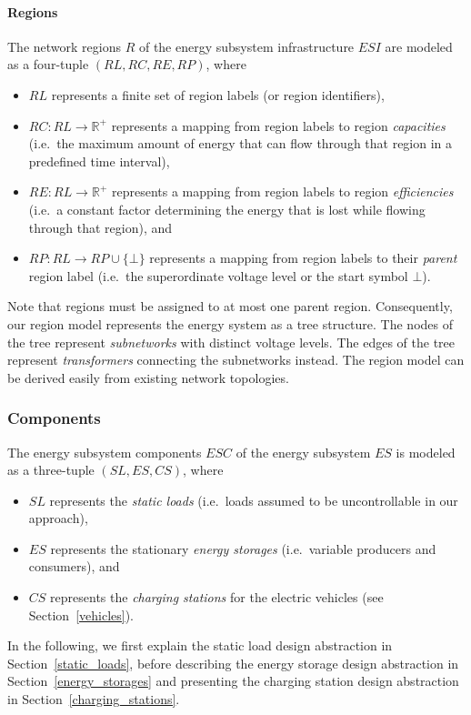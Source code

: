 \paragraph{Regions}
\label{regions}

The network regions $R$ of the energy subsystem infrastructure $ESI$ are modeled as a four-tuple $(RL, RC, RE, RP)$, where
\begin{itemize}
	\item $RL$ represents a finite set of region labels (or region identifiers),
	\item $RC: RL \rightarrow \mathbb{R}^+$ represents a mapping from region labels to region \textit{capacities} (i.e.\ the maximum amount of energy that can flow through that region in a predefined time interval),
	\item $RE: RL \rightarrow \mathbb{R}^+$ represents a mapping from region labels to region \textit{efficiencies} (i.e.\ a constant factor determining the energy that is lost while flowing through that region), and
	\item $RP: RL \rightarrow RP \cup \{\bot\}$ represents a mapping from region labels to their \textit{parent} region label (i.e.\ the superordinate voltage level or the start symbol $\bot$).
\end{itemize}
Note that regions must be assigned to at most one parent region. Consequently, our region model represents the energy system as a tree structure. The nodes of the tree represent \textit{subnetworks} with distinct voltage levels. The edges of the tree represent \textit{transformers} connecting the subnetworks instead. The region model can be derived easily from existing network topologies.

\subsubsection{Components}
\label{components}

The energy subsystem components $ESC$ of the energy subsystem $ES$ is modeled as a three-tuple $(SL, ES, CS)$, where
\begin{itemize}
	\item $SL$ represents the \textit{static loads} (i.e.\ loads assumed to be uncontrollable in our approach),
	\item $ES$ represents the stationary \textit{energy storages} (i.e.\ variable producers and consumers), and
	\item $CS$ represents the \textit{charging stations} for the electric vehicles (see Section~\ref{vehicles}).
\end{itemize}
In the following, we first explain the static load design abstraction in Section~\ref{static_loads}, before describing the energy storage design abstraction in Section~\ref{energy_storages} and presenting the charging station design abstraction in Section~\ref{charging_stations}.


